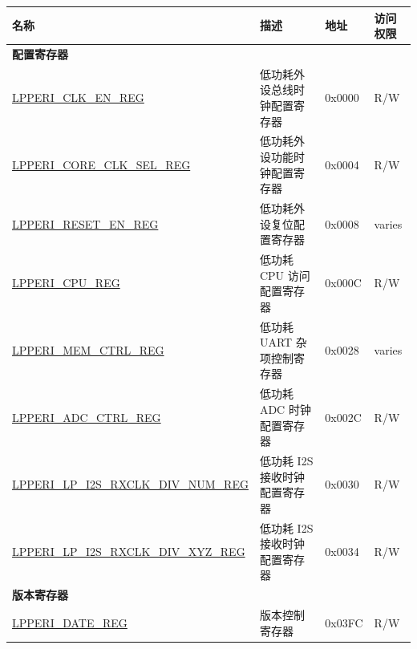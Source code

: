 \begin{longtable}{ | p{7.5cm} | p{6.2cm} | p{1.3cm} | p{1cm} | }
\hline\rowcolor{lightgray}
名称 & 描述 & 地址 & 访问权限 \\ \hline
\endhead
\multicolumn{4}{|l|}{\textbf{配置寄存器}} \\ \hline
\hyperref[regdesc:LPPERICLKENREG]{LPPERI\_CLK\_EN\_REG} & 低功耗外设总线时钟配置寄存器 & 0x0000 & R/W \\ \hline
\hyperref[regdesc:LPPERICORECLKSELREG]{LPPERI\_CORE\_CLK\_SEL\_REG} & 低功耗外设功能时钟配置寄存器 & 0x0004 & R/W \\ \hline
\hyperref[regdesc:LPPERIRESETENREG]{LPPERI\_RESET\_EN\_REG} & 低功耗外设复位配置寄存器 & 0x0008 & varies \\ \hline
\hyperref[regdesc:LPPERICPUREG]{LPPERI\_CPU\_REG} & 低功耗 CPU 访问配置寄存器 & 0x000C & R/W \\ \hline
\hyperref[regdesc:LPPERIMEMCTRLREG]{LPPERI\_MEM\_CTRL\_REG} & 低功耗 UART 杂项控制寄存器 & 0x0028 & varies \\ \hline
\hyperref[regdesc:LPPERIADCCTRLREG]{LPPERI\_ADC\_CTRL\_REG} & 低功耗 ADC 时钟配置寄存器 & 0x002C & R/W \\ \hline
\hyperref[regdesc:LPPERILPI2SRXCLKDIVNUMREG]{LPPERI\_LP\_I2S\_RXCLK\_DIV\_NUM\_REG} & 低功耗 I2S 接收时钟配置寄存器 & 0x0030 & R/W \\ \hline
\hyperref[regdesc:LPPERILPI2SRXCLKDIVXYZREG]{LPPERI\_LP\_I2S\_RXCLK\_DIV\_XYZ\_REG} & 低功耗 I2S 接收时钟配置寄存器 & 0x0034 & R/W \\ \hline
\multicolumn{4}{|l|}{\textbf{版本寄存器}} \\ \hline
\hyperref[regdesc:LPPERIDATEREG]{LPPERI\_DATE\_REG} & 版本控制寄存器 & 0x03FC & R/W \\ \hline
\end{longtable}
